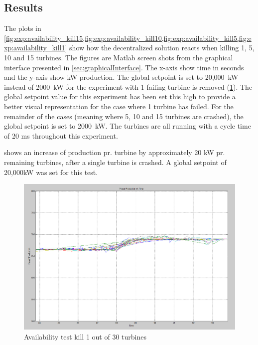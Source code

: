 \subsection{Results}
\label{sec:res:availability}
The plots in \cref{fig:exp:availability_kill15,fig:exp:availability_kill10,fig:exp:availability_kill5,fig:exp:availability_kill1} show how the decentralized solution reacts when killing 1, 5, 10 and 15 turbines. The figures are Matlab screen shots from the graphical interface presented in \cref{sec:graphicalInterface}. The x-axis show time in seconds and the y-axis show kW production. The global setpoint is set to 20,000~kW instead of 2000~kW for the experiment with 1 failing turbine is removed (\cref{fig:exp:availability_kill1}). The global setpoint value for this experiment has been set this high to provide a better visual representation for the case where 1 turbine has failed. 
For the remainder of the cases (meaning where 5, 10 and 15 turbines are crashed), the global setpoint is set to 2000~kW.
The turbines are all running with a cycle time of 20 ms throughout this experiment.

\clearpage
{} shows an increase of production pr. turbine by approximately 20 kW pr. remaining turbines, after a single turbine is crashed. A global setpoint of 20,000kW was set for this test.

\begin{figure} [!h]
	\centering
	\includegraphics[width=\resultsFigureWidthScale\textwidth]{figures/Results/availabilitytest30-29_setpoint_20000.PNG}
	\caption{Availability test kill 1 out of 30 turbines}
	\label{fig:exp:availability_kill1}
\end{figure}

